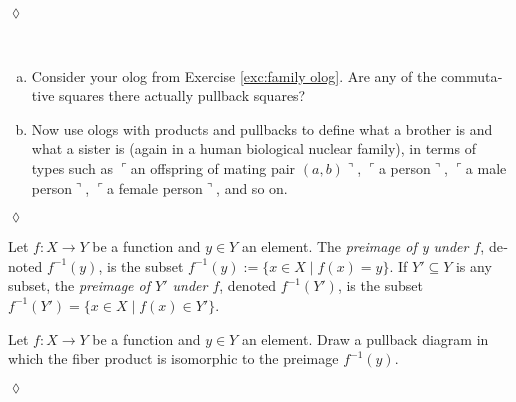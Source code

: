 \documentclass{book}
\def\tn{\textnormal}
\def\to{\rightarrow}
\def\taking{\colon}
\def\ss{\subseteq}
\def\|{{\;|\;}}
\def\m1{{-1}}
\newcommand{\fakebox}[1]{\tn{$\ulcorner$#1$\urcorner$}}
\theoremstyle{theoremENG}
\theoremstyle{lemmaENG}
\newtheorem{lemmaENG}[subsubsection]{\begin{english}Lemma\end{english}}
\theoremstyle{propositionENG}
\theoremstyle{corollaryENG}
\theoremstyle{factENG}
\theoremstyle{remarkENG}
\theoremstyle{exampleENG}
\theoremstyle{warningENG}
\theoremstyle{questionENG}
\theoremstyle{guessENG}
\theoremstyle{answerENG}
\theoremstyle{constructionENG}
\theoremstyle{rulesENG}
\theoremstyle{excENG}
\newtheorem{excENG}[subsubsection]{\begin{english}Exercise\end{english}}
\theoremstyle{appENG}
\theoremstyle{definitionENG}
\newtheorem{definitionENG}[subsubsection]{\begin{english}Definition\end{english}}
\theoremstyle{notationENG}
\theoremstyle{conjectureENG}
\theoremstyle{postulateENG}
\newenvironment{exerciseENG}{\begin{excENG}}{\hspace*{\fill}$\lozenge$\end{excENG}}
\theoremstyle{theoremRUS}
\theoremstyle{lemmaRUS}
\theoremstyle{propositionRUS}
\theoremstyle{corollaryRUS}
\theoremstyle{factRUS}
\theoremstyle{remarkRUS}
\theoremstyle{exampleRUS}
\theoremstyle{warningRUS}
\theoremstyle{questionRUS}
\theoremstyle{guessRUS}
\theoremstyle{answerRUS}
\theoremstyle{constructionRUS}
\theoremstyle{rulesRUS}
\theoremstyle{excRUS}
\theoremstyle{appRUS}
\theoremstyle{definitionRUS}
\theoremstyle{notationRUS}
\theoremstyle{conjectureRUS}
\theoremstyle{postulateRUS}
\def\sexc{\begin{enumerate}[a.)]\setlength{\itemsep}{.1cm}\setlength{\parskip}{.1cm}\item}
\def\next{\item}
\def\endsexc{\end{enumerate}}
\begin{document}
\begin{english}
\begin{exerciseENG}
\end{exerciseENG}

\begin{exerciseENG}~

\sexc Consider your olog from Exercise \ref{exc:family olog}. Are any of the commutative squares there actually pullback squares? 
\next Now use ologs with products and pullbacks to define what a brother is and what a sister is (again in a human biological nuclear family), in terms of types such as \fakebox{an offspring of mating pair $(a,b)$}, \fakebox{a person}, \fakebox{a male person}, \fakebox{a female person}, and so on.
\endsexc

\begin{russian} \end{russian}

\end{exerciseENG}

\begin{definitionENG}[Preimage]\label{def:preimage}

Let $f\taking X\to Y$ be a function and $y\in Y$ an element. The {\em preimage of y under $f$}, denoted $f^\m1(y)$,\index{a symbol!$f^\m1$} is  the subset $f^\m1(y):=\{x\in X\|f(x)=y\}$. If $Y'\ss Y$ is any subset, the {\em preimage of $Y'$ under $f$}, denoted $f^\m1(Y')$, is the subset $f^\m1(Y')=\{x\in X\|f(x)\in Y'\}$.

\begin{russian} \end{russian}

\end{definitionENG}

\begin{exerciseENG}

Let $f\taking X\to Y$ be a function and $y\in Y$ an element. Draw a pullback diagram in which the fiber product is isomorphic to the preimage $f^\m1(y)$.

\begin{russian} \end{russian}

\end{exerciseENG}

\begin{lemmaENG}\label{lemma:up for fp}


\end{lemmaENG}
\end{english}
\end{document}
